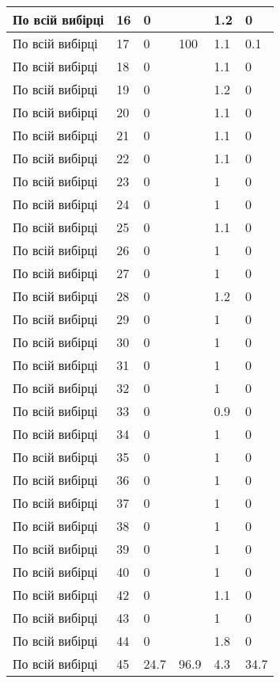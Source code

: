 \begin{longtable}[c]{ | p{2cm} | p{2cm} | p{2cm} | p{2cm} | p{3cm} | p{3cm} | }
	\hline
	По всій вибірці & 16 & 0 &  & 1.2 & 0 \\
	\hline
	По всій вибірці & 17 & 0 & 100 & 1.1 & 0.1 \\
	\hline
	По всій вибірці & 18 & 0 &  & 1.1 & 0 \\
	\hline
	По всій вибірці & 19 & 0 &  & 1.2 & 0 \\
	\hline
	По всій вибірці & 20 & 0 &  & 1.1 & 0 \\
	\hline
	По всій вибірці & 21 & 0 &  & 1.1 & 0 \\
	\hline
	По всій вибірці & 22 & 0 &  & 1.1 & 0 \\
	\hline
	По всій вибірці & 23 & 0 &  & 1 & 0 \\
	\hline
	По всій вибірці & 24 & 0 &  & 1 & 0 \\
	\hline
	По всій вибірці & 25 & 0 &  & 1.1 & 0 \\
	\hline
	По всій вибірці & 26 & 0 &  & 1 & 0 \\
	\hline
	По всій вибірці & 27 & 0 &  & 1 & 0 \\
	\hline
	По всій вибірці & 28 & 0 &  & 1.2 & 0 \\
	\hline
	По всій вибірці & 29 & 0 &  & 1 & 0 \\
	\hline
	По всій вибірці & 30 & 0 &  & 1 & 0 \\
	\hline
	По всій вибірці & 31 & 0 &  & 1 & 0 \\
	\hline
	По всій вибірці & 32 & 0 &  & 1 & 0 \\
	\hline
	По всій вибірці & 33 & 0 &  & 0.9 & 0 \\
	\hline
	По всій вибірці & 34 & 0 &  & 1 & 0 \\
	\hline
	По всій вибірці & 35 & 0 &  & 1 & 0 \\
	\hline
	По всій вибірці & 36 & 0 &  & 1 & 0 \\
	\hline
	По всій вибірці & 37 & 0 &  & 1 & 0 \\
	\hline
	По всій вибірці & 38 & 0 &  & 1 & 0 \\
	\hline
	По всій вибірці & 39 & 0 &  & 1 & 0 \\
	\hline
	По всій вибірці & 40 & 0 &  & 1 & 0 \\
	\hline
	По всій вибірці & 42 & 0 &  & 1.1 & 0 \\
	\hline
	По всій вибірці & 43 & 0 &  & 1 & 0 \\
	\hline
	По всій вибірці & 44 & 0 &  & 1.8 & 0 \\
	\hline
	По всій вибірці & 45 & 24.7 & 96.9 & 4.3 & 34.7 \\
	\hline

\end{longtable}
